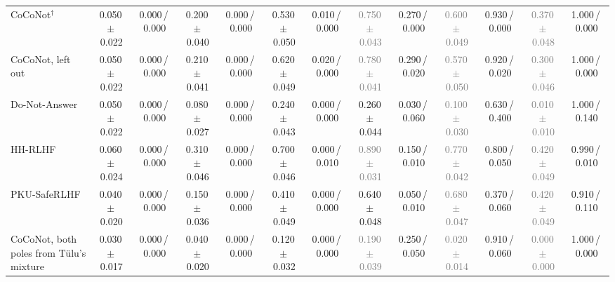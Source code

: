 \begin{tabular}{@{}lcccccccccccc@{}}
CoCoNot$^\dagger$ & 0.050\,{\scriptsize$\pm$\,0.022} & {\scriptsize 0.000\,/\,0.000} & 0.200\,{\scriptsize$\pm$\,0.040} & {\scriptsize 0.000\,/\,0.000} & 0.530\,{\scriptsize$\pm$\,0.050} & {\scriptsize 0.010\,/\,0.000} & \textcolor{gray}{0.750\,{\scriptsize$\pm$\,0.043}} & {\scriptsize 0.270\,/\,0.000} & \textcolor{gray}{0.600\,{\scriptsize$\pm$\,0.049}} & {\scriptsize 0.930\,/\,0.000} & \textcolor{gray}{0.370\,{\scriptsize$\pm$\,0.048}} & {\scriptsize 1.000\,/\,0.000} \\
CoCoNot, left out & 0.050\,{\scriptsize$\pm$\,0.022} & {\scriptsize 0.000\,/\,0.000} & 0.210\,{\scriptsize$\pm$\,0.041} & {\scriptsize 0.000\,/\,0.000} & 0.620\,{\scriptsize$\pm$\,0.049} & {\scriptsize 0.020\,/\,0.000} & \textcolor{gray}{0.780\,{\scriptsize$\pm$\,0.041}} & {\scriptsize 0.290\,/\,0.020} & \textcolor{gray}{0.570\,{\scriptsize$\pm$\,0.050}} & {\scriptsize 0.920\,/\,0.020} & \textcolor{gray}{0.300\,{\scriptsize$\pm$\,0.046}} & {\scriptsize 1.000\,/\,0.000} \\
Do-Not-Answer & 0.050\,{\scriptsize$\pm$\,0.022} & {\scriptsize 0.000\,/\,0.000} & 0.080\,{\scriptsize$\pm$\,0.027} & {\scriptsize 0.000\,/\,0.000} & 0.240\,{\scriptsize$\pm$\,0.043} & {\scriptsize 0.000\,/\,0.000} & 0.260\,{\scriptsize$\pm$\,0.044} & {\scriptsize 0.030\,/\,0.060} & \textcolor{gray}{0.100\,{\scriptsize$\pm$\,0.030}} & {\scriptsize 0.630\,/\,0.400} & \textcolor{gray}{0.010\,{\scriptsize$\pm$\,0.010}} & {\scriptsize 1.000\,/\,0.140} \\
HH-RLHF & 0.060\,{\scriptsize$\pm$\,0.024} & {\scriptsize 0.000\,/\,0.000} & 0.310\,{\scriptsize$\pm$\,0.046} & {\scriptsize 0.000\,/\,0.000} & 0.700\,{\scriptsize$\pm$\,0.046} & {\scriptsize 0.000\,/\,0.010} & \textcolor{gray}{0.890\,{\scriptsize$\pm$\,0.031}} & {\scriptsize 0.150\,/\,0.010} & \textcolor{gray}{0.770\,{\scriptsize$\pm$\,0.042}} & {\scriptsize 0.800\,/\,0.050} & \textcolor{gray}{0.420\,{\scriptsize$\pm$\,0.049}} & {\scriptsize 0.990\,/\,0.010} \\
PKU-SafeRLHF & 0.040\,{\scriptsize$\pm$\,0.020} & {\scriptsize 0.000\,/\,0.000} & 0.150\,{\scriptsize$\pm$\,0.036} & {\scriptsize 0.000\,/\,0.000} & 0.410\,{\scriptsize$\pm$\,0.049} & {\scriptsize 0.000\,/\,0.000} & 0.640\,{\scriptsize$\pm$\,0.048} & {\scriptsize 0.050\,/\,0.010} & \textcolor{gray}{0.680\,{\scriptsize$\pm$\,0.047}} & {\scriptsize 0.370\,/\,0.060} & \textcolor{gray}{0.420\,{\scriptsize$\pm$\,0.049}} & {\scriptsize 0.910\,/\,0.110} \\
CoCoNot, both poles from T\"ulu's mixture & 0.030\,{\scriptsize$\pm$\,0.017} & {\scriptsize 0.000\,/\,0.000} & 0.040\,{\scriptsize$\pm$\,0.020} & {\scriptsize 0.000\,/\,0.000} & 0.120\,{\scriptsize$\pm$\,0.032} & {\scriptsize 0.000\,/\,0.000} & \textcolor{gray}{0.190\,{\scriptsize$\pm$\,0.039}} & {\scriptsize 0.250\,/\,0.050} & \textcolor{gray}{0.020\,{\scriptsize$\pm$\,0.014}} & {\scriptsize 0.910\,/\,0.060} & \textcolor{gray}{0.000\,{\scriptsize$\pm$\,0.000}} & {\scriptsize 1.000\,/\,0.000} \\

\end{tabular}
